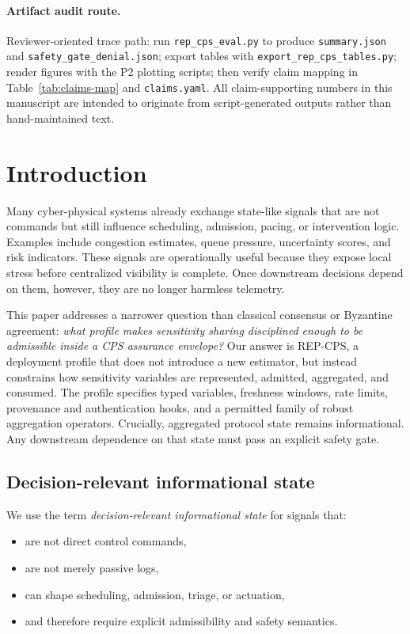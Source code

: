 \documentclass[11pt]{article}
\newcommand{\repcps}{REP-CPS}
\newcommand{\tool}[1]{\texttt{#1}}
\newcommand{\field}[1]{\texttt{#1}}
\begin{document}
\paragraph{Artifact audit route.}
Reviewer-oriented trace path: run \tool{rep\_cps\_eval.py} to produce \field{summary.json} and \field{safety\_gate\_denial.json}; export tables with \tool{export\_rep\_cps\_tables.py}; render figures with the P2 plotting scripts; then verify claim mapping in Table~\ref{tab:claims-map} and \tool{claims.yaml}. All claim-supporting numbers in this manuscript are intended to originate from script-generated outputs rather than hand-maintained text.

\section{Introduction}

Many cyber-physical systems already exchange state-like signals that are not commands but still influence scheduling, admission, pacing, or intervention logic. Examples include congestion estimates, queue pressure, uncertainty scores, and risk indicators. These signals are operationally useful because they expose local stress before centralized visibility is complete. Once downstream decisions depend on them, however, they are no longer harmless telemetry.

This paper addresses a narrower question than classical consensus or Byzantine agreement: \emph{what profile makes sensitivity sharing disciplined enough to be admissible inside a CPS assurance envelope?} Our answer is \repcps{}, a deployment profile that does not introduce a new estimator, but instead constrains how sensitivity variables are represented, admitted, aggregated, and consumed. The profile specifies typed variables, freshness windows, rate limits, provenance and authentication hooks, and a permitted family of robust aggregation operators. Crucially, aggregated protocol state remains informational. Any downstream dependence on that state must pass an explicit safety gate.

\subsection{Decision-relevant informational state}

We use the term \emph{decision-relevant informational state} for signals that:
\begin{itemize}[leftmargin=1.5em]
    \item are not direct control commands,
    \item are not merely passive logs,
    \item can shape scheduling, admission, triage, or actuation,
    \item and therefore require explicit admissibility and safety semantics.
\end{itemize}
\end{document}
